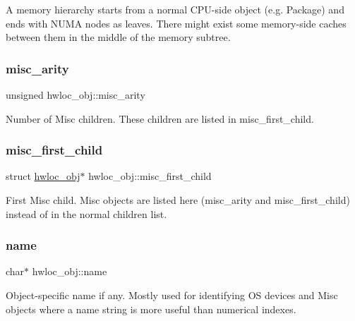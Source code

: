 A memory hierarchy starts from a normal C\+P\+U-\/side object (e.\+g. Package) and ends with N\+U\+MA nodes as leaves. There might exist some memory-\/side caches between them in the middle of the memory subtree. \mbox{\label{a00238_a2bb7862ce722d7ceda23cfa153da165a}} 
\subsubsection{\texorpdfstring{misc\+\_\+arity}{misc\_arity}}
{\footnotesize\ttfamily unsigned hwloc\+\_\+obj\+::misc\+\_\+arity}



Number of Misc children. These children are listed in {\ttfamily misc\+\_\+first\+\_\+child}. 

\mbox{\label{a00238_a57812a313fe9b1a9500489f47c3011cc}} 
\subsubsection{\texorpdfstring{misc\+\_\+first\+\_\+child}{misc\_first\_child}}
{\footnotesize\ttfamily struct \hyperlink{a00238}{hwloc\+\_\+obj}$\ast$ hwloc\+\_\+obj\+::misc\+\_\+first\+\_\+child}



First Misc child. Misc objects are listed here ({\ttfamily misc\+\_\+arity} and {\ttfamily misc\+\_\+first\+\_\+child}) instead of in the normal children list. 

\mbox{\label{a00238_abb709ec38f2970677e4e57d1d30be96d}} 
\subsubsection{\texorpdfstring{name}{name}}
{\footnotesize\ttfamily char$\ast$ hwloc\+\_\+obj\+::name}



Object-\/specific name if any. Mostly used for identifying OS devices and Misc objects where a name string is more useful than numerical indexes. 

